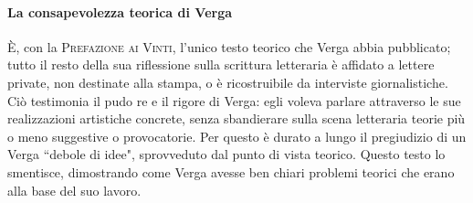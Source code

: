 \documentclass{book}
\begin{document}
\paragraph{La consapevolezza teorica di Verga} È, con la \textsc{Prefazione ai Vinti}, l'unico testo teorico che Verga abbia pubblicato; tutto il resto della sua riflessione sulla scrittura letteraria è affidato a lettere private, non destinate alla stampa, o è ricostruibile da interviste giornalistiche. Ciò testimonia il pudo re e il rigore di Verga: egli voleva parlare attraverso le sue realizzazioni artistiche concrete, senza sbandierare sulla scena letteraria teorie più o meno suggestive o provocatorie. Per questo è durato a lungo il pregiudizio di un Verga “debole di idee", sprovveduto dal punto
di vista teorico. Questo testo lo smentisce, dimostrando come Verga avesse ben chiari problemi teorici che erano alla base del suo lavoro.
\end{document}
